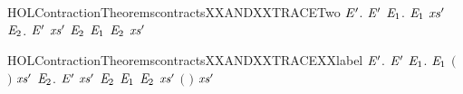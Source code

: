 \begin{SaveVerbatim}{HOLContractionTheoremscontractsXXANDXXTRACETwo}
\HOLTokenTurnstile{} \HOLSymConst{\HOLTokenForall{}} \ensuremath{\HOLBoundVar{E}\sp{\prime{}}}.
       \ensuremath{\HOLBoundVar{E}\sp{\prime{}}} \HOLSymConst{\HOLTokenImp{}}
     \HOLSymConst{\HOLTokenForall{}} \ensuremath{\HOLBoundVar{E}\sb{\mathrm{1}}}.
          \ensuremath{\HOLBoundVar{E}\sb{\mathrm{1}}} \HOLSymConst{\HOLTokenImp{}}
       \HOLSymConst{\HOLTokenExists{}}\ensuremath{\HOLBoundVar{xs}\sp{\prime{}}} \ensuremath{\HOLBoundVar{E}\sb{\mathrm{2}}}.
          \ensuremath{\HOLBoundVar{E}\sp{\prime{}}} \ensuremath{\HOLBoundVar{xs}\sp{\prime{}}} \ensuremath{\HOLBoundVar{E}\sb{\mathrm{2}}} \HOLSymConst{\HOLTokenConj{}} \ensuremath{\HOLBoundVar{E}\sb{\mathrm{1}}}  \ensuremath{\HOLBoundVar{E}\sb{\mathrm{2}}} \HOLSymConst{\HOLTokenConj{}}
          \ensuremath{\HOLBoundVar{xs}\sp{\prime{}}} \HOLSymConst{\HOLTokenLeq{}}  
\end{SaveVerbatim}
\newcommand{\HOLContractionTheoremscontractsXXANDXXTRACETwo}{\UseVerbatim{HOLContractionTheoremscontractsXXANDXXTRACETwo}}
\begin{SaveVerbatim}{HOLContractionTheoremscontractsXXANDXXTRACEXXlabel}
\HOLTokenTurnstile{} \HOLSymConst{\HOLTokenForall{}} \ensuremath{\HOLBoundVar{E}\sp{\prime{}}}.
       \ensuremath{\HOLBoundVar{E}\sp{\prime{}}} \HOLSymConst{\HOLTokenImp{}}
     \HOLSymConst{\HOLTokenForall{}}  \ensuremath{\HOLBoundVar{E}\sb{\mathrm{1}}}.
          \ensuremath{\HOLBoundVar{E}\sb{\mathrm{1}}} \HOLSymConst{\HOLTokenConj{}}  \ensuremath{(} \ensuremath{)}  \HOLSymConst{\HOLTokenImp{}}
       \HOLSymConst{\HOLTokenExists{}}\ensuremath{\HOLBoundVar{xs}\sp{\prime{}}} \ensuremath{\HOLBoundVar{E}\sb{\mathrm{2}}}.
          \ensuremath{\HOLBoundVar{E}\sp{\prime{}}} \ensuremath{\HOLBoundVar{xs}\sp{\prime{}}} \ensuremath{\HOLBoundVar{E}\sb{\mathrm{2}}} \HOLSymConst{\HOLTokenConj{}} \ensuremath{\HOLBoundVar{E}\sb{\mathrm{1}}}  \ensuremath{\HOLBoundVar{E}\sb{\mathrm{2}}} \HOLSymConst{\HOLTokenConj{}}
          \ensuremath{\HOLBoundVar{xs}\sp{\prime{}}} \HOLSymConst{\HOLTokenLeq{}}   \HOLSymConst{\HOLTokenConj{}}  \ensuremath{(} \ensuremath{)} \ensuremath{\HOLBoundVar{xs}\sp{\prime{}}}
\end{SaveVerbatim}
